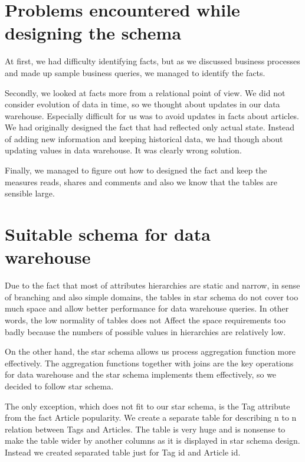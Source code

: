 \section{Problems encountered while designing the schema} %
\label{sub:Problems encountered while designing the schema}

At first, we had difficulty identifying facts, but as we discussed business processes and made up sample business queries, we managed to identify the facts.

Secondly, we looked at facts more from a relational point of view. We did not consider evolution
of data in time, so we thought about updates in our data warehouse. Especially difficult for us was to avoid updates in facts about articles. We had originally designed the fact that had reflected only actual state. Instead of adding new information and keeping historical data, we had though about updating values in data warehouse. It was clearly wrong solution.

Finally, we managed to figure out how to designed the fact and keep the measures reads, shares and comments and also we know that the tables are sensible large.

\section{Suitable schema for data warehouse} %
\label{sub:Suitable schema for data warehouse}
Due to the fact that most of attributes hierarchies are static and narrow, in sense of branching and also simple domains, the tables in star schema do not cover too much space and allow better performance for data warehouse queries. In other words, the low normality of tables does not Affect the space requirements too badly because the numbers of possible values in hierarchies are relatively low.

On the other hand, the star schema allows us process aggregation function more effectively.
The aggregation functions together with joins are the key operations for data warehouse and
the star schema implements them effectively, so we decided to follow star schema.

The only exception, which does not fit to our star schema, is the Tag attribute from the fact Article popularity. We create a separate table for describing n to n relation between Tags and Articles. The table is very huge and is nonsense  to make the table wider by another columns as it is displayed in star schema design. Instead we created separated table just for Tag id and Article id.
